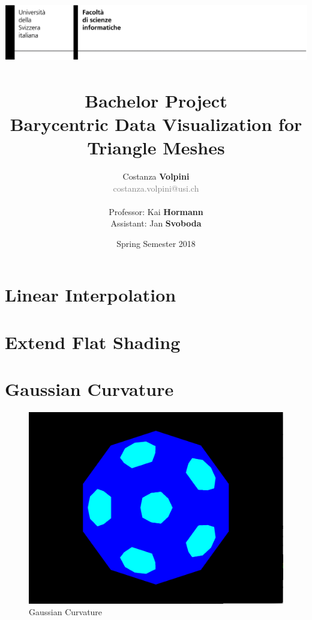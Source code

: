 \documentclass[11pt]{article}
\title{ \includegraphics[width=\linewidth]{header.png}~
\\[0.5cm]
  \huge{Bachelor Project} \\
\textbf{\Large{Barycentric Data Visualization for Triangle Meshes}}}
\date{Spring Semester 2018}
\author{Costanza \textbf{Volpini} \\ \textcolor{gray}{costanza.volpini@usi.ch} \\ \\ Professor: Kai \textbf{Hormann} \\ Assistant: Jan \textbf{Svoboda}}
\begin{document}
\pagestyle{fancy}
\maketitle
{}

\section{Linear Interpolation}
\section{Extend Flat Shading}
\section{Gaussian Curvature}
\begin{figure}[!htb]
    \includegraphics[width=\linewidth]{gaussian-ball.png}
    \caption{Gaussian Curvature}\label{fig:gaussian-ball}
  \end{figure}
\end{document}
